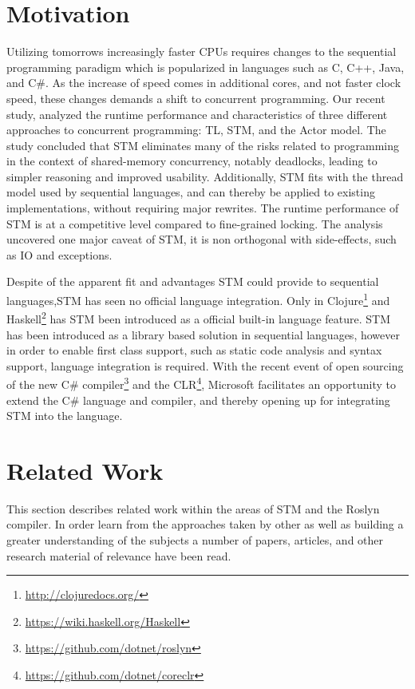 \makeatletter {}\makeatother
{}
%
\section{Motivation}
Utilizing tomorrows increasingly faster \acp{CPU} requires changes to the sequential programming paradigm which is popularized in languages such as C, C++, Java, and C\#. As the increase of speed comes in additional cores, and not faster clock speed\cite{sutter2005free}, these changes demands a shift to concurrent programming. Our recent study\cite{dpt907e14trending}, analyzed the runtime performance and characteristics of three different approaches to concurrent programming: \ac{TL}, \ac{STM}, and the Actor model. The study concluded that \ac{STM} eliminates many of the risks related to programming in the context of shared-memory concurrency, notably deadlocks, leading to simpler reasoning and improved usability. Additionally, \ac{STM} fits with the thread model used by sequential languages, and can thereby be applied to existing implementations, without requiring major rewrites. The runtime performance of \ac{STM} is at a competitive level compared to fine-grained locking\cite{dpt907e14trending}. The analysis uncovered one major caveat of \ac{STM}, it is non orthogonal with side-effects, such as \ac{IO} and exceptions\cite{dpt907e14trending}.

Despite of the apparent fit and advantages \ac{STM} could provide to sequential languages,\ac{STM} has seen no official language integration. Only in Clojure\footnote{\url{http://clojuredocs.org/}} and Haskell\footnote{\url{https://wiki.haskell.org/Haskell}} has \ac{STM} been introduced as a official built-in language feature. \ac{STM} has been introduced as a library based solution in sequential languages, however in order to enable first class support, such as static code analysis and syntax support, language integration is required. With the recent event of open sourcing of the new C\# compiler\footnote{\url{https://github.com/dotnet/roslyn}} and the \ac{CLR}\footnote{\url{https://github.com/dotnet/coreclr}}, Microsoft facilitates an opportunity to extend the C\# language and compiler, and thereby opening up for integrating \ac{STM} into the language.

\section{Related Work}
This section describes related work within the areas of \ac{STM} and the Roslyn compiler. In order learn from the approaches taken by other as well as building a greater understanding of the subjects a number of papers, articles, and other research material of relevance have been read. 

